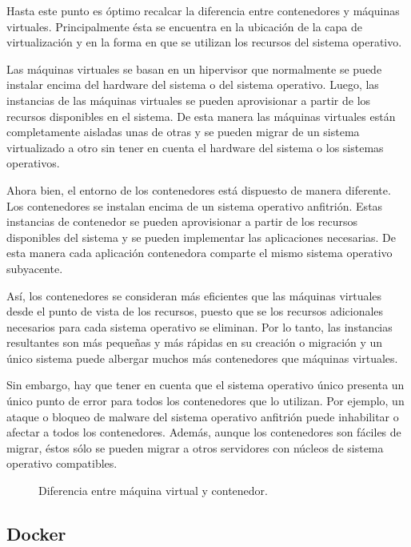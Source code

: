 Hasta este punto es óptimo recalcar la diferencia entre contenedores y máquinas virtuales. Principalmente ésta se encuentra en la ubicación de la capa de virtualización y en la forma en que se utilizan los recursos del sistema operativo.

Las máquinas virtuales se basan en un hipervisor que normalmente se puede instalar encima del hardware del sistema o del sistema operativo. Luego, las instancias de las máquinas virtuales se pueden aprovisionar a partir de los recursos disponibles en el sistema. De esta manera las máquinas virtuales están completamente aisladas unas de otras y se pueden migrar de un sistema virtualizado a otro sin tener en cuenta el hardware del sistema o los sistemas operativos.

Ahora bien, el entorno de los contenedores está dispuesto de manera diferente. Los contenedores se instalan encima de un sistema operativo anfitrión. Estas instancias de contenedor se pueden aprovisionar a partir de los recursos disponibles del sistema y se pueden implementar las aplicaciones necesarias. De esta manera cada aplicación contenedora comparte el mismo sistema operativo subyacente.

Así, los contenedores se consideran más eficientes que las máquinas virtuales desde el punto de vista de los recursos, puesto que se los recursos adicionales necesarios para cada sistema operativo se eliminan. Por lo tanto, las instancias resultantes son más pequeñas y más rápidas en su creación o migración y un único sistema puede albergar muchos más contenedores que máquinas virtuales.

Sin embargo, hay que tener en cuenta que el sistema operativo único presenta un único punto de error para todos los contenedores que lo utilizan. Por ejemplo, un ataque o bloqueo de malware del sistema operativo anfitrión puede inhabilitar o afectar a todos los contenedores. Además, aunque los contenedores son fáciles de migrar, éstos sólo se pueden migrar a otros servidores con núcleos de sistema operativo compatibles.

\begin{figure}[H]
\caption{Diferencia entre máquina virtual y contenedor.\label{fig:figure_placement_example}}
\end{figure}

\subsection{Docker}

